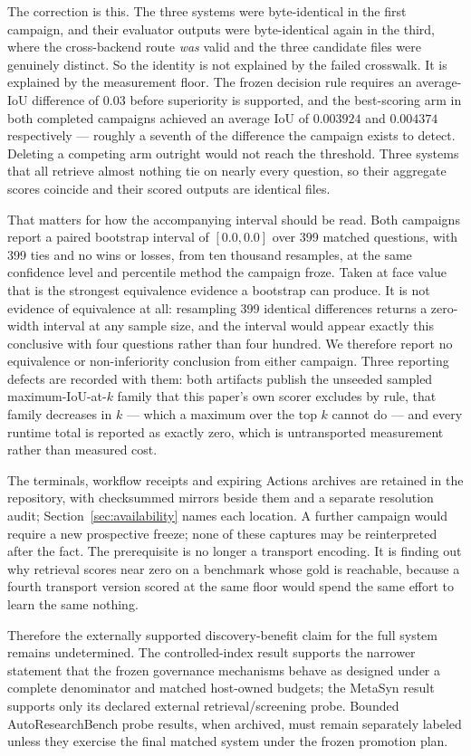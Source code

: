 The correction is this.  The three systems were byte-identical in the first
campaign, and their evaluator outputs were byte-identical again in the third,
where the cross-backend route \emph{was} valid and the three candidate files
were genuinely distinct.  So the identity is not explained by the failed
crosswalk.  It is explained by the measurement floor.  The frozen decision rule
requires an average-IoU difference of $0.03$ before superiority is supported,
and the best-scoring arm in both completed campaigns achieved an average IoU of
$0.003924$ and $0.004374$ respectively --- roughly a seventh of the difference
the campaign exists to detect.  Deleting a competing arm outright would not
reach the threshold.  Three systems that all retrieve almost nothing tie on
nearly every question, so their aggregate scores coincide and their scored
outputs are identical files.

That matters for how the accompanying interval should be read.  Both campaigns
report a paired bootstrap interval of $[0.0, 0.0]$ over 399 matched
questions, with 399 ties and no wins or losses, from ten thousand resamples, at
the same confidence level and percentile method the campaign froze.  Taken
at face value that is the strongest equivalence evidence a bootstrap can
produce.  It is not evidence of equivalence at all: resampling 399 identical
differences returns a zero-width interval at any sample size, and the interval
would appear exactly this conclusive with four questions rather than four
hundred.  We therefore report no equivalence or non-inferiority conclusion from
either campaign.  Three reporting defects are recorded with them: both artifacts
publish the unseeded sampled maximum-IoU-at-$k$ family that this paper's
own scorer excludes by rule, that family decreases in $k$ --- which a maximum
over the top $k$ cannot do --- and every runtime total is reported as exactly
zero, which is untransported measurement rather than measured cost.

The terminals, workflow receipts and expiring Actions archives are retained in
the repository, with checksummed mirrors beside them and a separate resolution
audit; Section~\ref{sec:availability} names each location.  A further campaign
would require a new prospective
freeze; none of these captures may be reinterpreted after the fact.  The
prerequisite is no longer a transport encoding.  It is finding out why retrieval
scores near zero on a benchmark whose gold is reachable, because a fourth
transport version scored at the same floor would spend the same effort to learn
the same nothing.

Therefore the externally supported discovery-benefit claim for the full system
remains undetermined.  The controlled-index result supports the narrower
statement that the frozen governance mechanisms behave as designed under a
complete denominator and matched host-owned budgets; the MetaSyn result supports
only its declared external retrieval/screening probe.  Bounded AutoResearchBench
probe results, when archived, must remain separately labeled unless they exercise
the final matched system under the frozen promotion plan.

